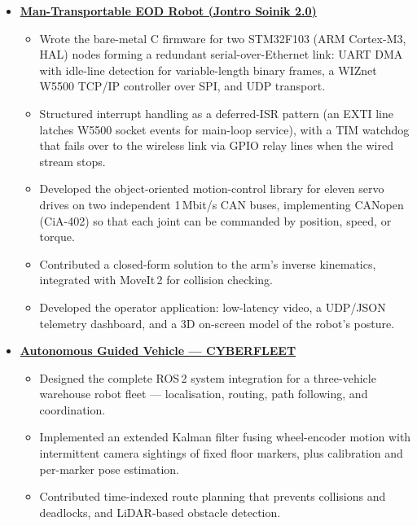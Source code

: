 \documentclass[10pt]{article}
\newenvironment{subprojects}
  {\begin{itemize}[label={}, leftmargin=0.9em, itemsep=3pt, topsep=2pt]}
  {\end{itemize}}
\begin{document}
\begin{subprojects}

    \item \textbf{\href{https://www.youtube.com/watch?v=v_SOAQoPP6Q}{Man-Transportable EOD Robot
    (Jontro Soinik 2.0)}}
    \begin{itemize}
        \item Wrote the bare-metal C firmware for two STM32F103 (ARM Cortex-M3, HAL) nodes forming
        a redundant serial-over-Ethernet link: UART DMA with idle-line detection for variable-length
        binary frames, a WIZnet W5500 TCP/IP controller over SPI, and UDP transport.
        \item Structured interrupt handling as a deferred-ISR pattern (an EXTI line latches W5500
        socket events for main-loop service), with a TIM watchdog that fails over to the wireless
        link via GPIO relay lines when the wired stream stops.
        \item Developed the object-oriented motion-control library for eleven servo drives on two
        independent 1\,Mbit/s CAN buses, implementing CANopen (CiA-402) so that each joint can be
        commanded by position, speed, or torque.
        \item Contributed a closed-form solution to the arm's inverse kinematics, integrated with
        MoveIt\,2 for collision checking.
        \item Developed the operator application: low-latency video, a UDP/JSON telemetry dashboard,
        and a 3D on-screen model of the robot's posture.
    \end{itemize}

    \item \textbf{\href{https://youtu.be/TkmOu6lCBTw?si=8KOdXk-vVMPzP4vm}{Autonomous Guided Vehicle
    --- CYBERFLEET}}
    \begin{itemize}
        \item Designed the complete ROS\,2 system integration for a three-vehicle warehouse robot
        fleet --- localisation, routing, path following, and coordination.
        \item Implemented an extended Kalman filter fusing wheel-encoder motion with intermittent
        camera sightings of fixed floor markers, plus calibration and per-marker pose estimation.
        \item Contributed time-indexed route planning that prevents collisions and deadlocks, and
        LiDAR-based obstacle detection.
    \end{itemize}


\end{subprojects}
\end{document}
